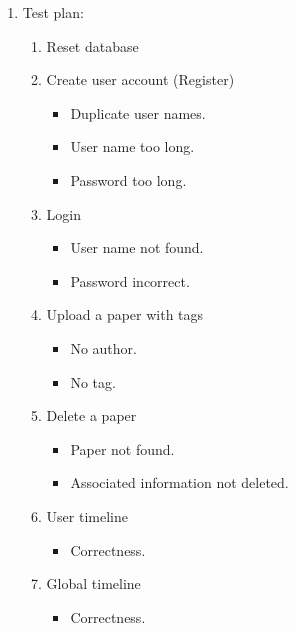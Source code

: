 \documentclass{article}
\begin{document}
\begin{enumerate}[start=3]
    \item Test plan:
    
    \begin{enumerate}
        \item Reset database
        
        \item Create user account (Register)
        \begin{itemize}
            \item Duplicate user names.
            \item User name too long.
            \item Password too long.
        \end{itemize}

        \item Login
        \begin{itemize}
            \item User name not found.
            \item Password incorrect.
        \end{itemize}

        \item Upload a paper with tags
        \begin{itemize}
            \item No author.
            \item No tag.
        \end{itemize}

        \item Delete a paper
        \begin{itemize}
          \item Paper not found.
          \item Associated information not deleted.
        \end{itemize}

        \item User timeline
        \begin{itemize}
            \item Correctness.
        \end{itemize}

        \item Global timeline
        \begin{itemize}
            \item Correctness.
        \end{itemize}


\end{enumerate}
\end{enumerate}
\end{document}
